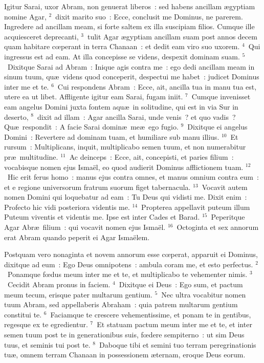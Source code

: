 \lettrine[lines=3,image=true,loversize=0.05,lraise=-0.03]{I}{}gitur Sarai, uxor Abram, non genuerat liberos~: sed habens ancillam \ae gyptiam nomine Agar,
${}^{2}$~dixit marito suo~: Ecce, conclusit me Dominus, ne parerem. Ingredere ad ancillam meam, si forte saltem ex illa suscipiam filios. Cumque ille acquiesceret deprecanti,
${}^{3}$~tulit Agar \ae gyptiam ancillam suam post annos decem quam habitare cœperant in terra Chanaan~: et dedit eam viro suo uxorem.
${}^{4}$~Qui ingressus est ad eam. At illa concepisse se videns, despexit dominam suam.
${}^{5}$~Dixitque Sarai ad Abram~: Inique agis contra me~: ego dedi ancillam meam in sinum tuum, qu\ae\ videns quod conceperit, despectui me habet~: judicet Dominus inter me et te.
${}^{6}$~Cui respondens Abram~: Ecce, ait, ancilla tua in manu tua est, utere ea ut libet. Affligente igitur eam Sarai, fugam iniit.
${}^{7}$~Cumque invenisset eam angelus Domini juxta fontem aqu\ae\ in solitudine, qui est in via Sur in deserto,
${}^{8}$~dixit ad illam~: Agar ancilla Sarai, unde venis~? et quo vadis~? Qu\ae\ respondit~: A facie Sarai domin\ae\ me\ae\ ego fugio.
${}^{9}$~Dixitque ei angelus Domini~: Revertere ad dominam tuam, et humiliare sub manu illius.
${}^{10}$~Et rursum~: Multiplicans, inquit, multiplicabo semen tuum, et non numerabitur pr\ae\ multitudine.
${}^{11}$~Ac deinceps~: Ecce, ait, concepisti, et paries filium~: vocabisque nomen ejus Isma\"el, eo quod audierit Dominus afflictionem tuam.
${}^{12}$~Hic erit ferus homo~: manus ejus contra omnes, et manus omnium contra eum~: et e regione universorum fratrum suorum figet tabernacula.
${}^{13}$~Vocavit autem nomen Domini qui loquebatur ad eam~: Tu Deus qui vidisti me. Dixit enim~: Profecto hic vidi posteriora videntis me.
${}^{14}$~Propterea appellavit puteum illum Puteum viventis et videntis me. Ipse est inter Cades et Barad.
${}^{15}$~Peperitque Agar Abr\ae\ filium~: qui vocavit nomen ejus Isma\"el.
${}^{16}$~Octoginta et sex annorum erat Abram quando peperit ei Agar Isma\"elem.

\lettrine[lines=3,image=true,loversize=0.05,lraise=-0.03]{P}{}ostquam vero nonaginta et novem annorum esse cœperat, apparuit ei Dominus, dixitque ad eum~: Ego Deus omnipotens~: ambula coram me, et esto perfectus.
${}^{2}$~Ponamque fœdus meum inter me et te, et multiplicabo te vehementer nimis.
${}^{3}$~Cecidit Abram pronus in faciem.
${}^{4}$~Dixitque ei Deus~: Ego sum, et pactum meum tecum, erisque pater multarum gentium.
${}^{5}$~Nec ultra vocabitur nomen tuum Abram, sed appellaberis Abraham~: quia patrem multarum gentium constitui te.
${}^{6}$~Faciamque te crescere vehementissime, et ponam te in gentibus, regesque ex te egredientur.
${}^{7}$~Et statuam pactum meum inter me et te, et inter semen tuum post te in generationibus suis, fœdere sempiterno~: ut sim Deus tuus, et seminis tui post te.
${}^{8}$~Daboque tibi et semini tuo terram peregrinationis tu\ae , omnem terram Chanaan in possessionem \ae ternam, eroque Deus eorum.


